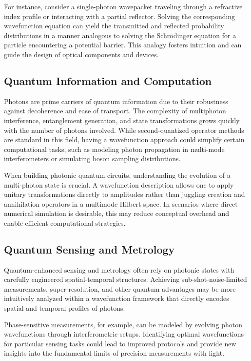 \documentclass[aps,prl,twocolumn,showpacs,showkeys,superscriptaddress,amsmath,amssymb]{revtex4-2}
\begin{document}
For instance, consider a single-photon wavepacket traveling through a refractive index profile or interacting with a partial reflector. Solving the corresponding wavefunction equation can yield the transmitted and reflected probability distributions in a manner analogous to solving the Schr\"odinger equation for a particle encountering a potential barrier. This analogy fosters intuition and can guide the design of optical components and devices.

\subsection{Quantum Information and Computation}

Photons are prime carriers of quantum information due to their robustness against decoherence and ease of transport. The complexity of multiphoton interference, entanglement generation, and state transformations grows quickly with the number of photons involved. While second-quantized operator methods are standard in this field, having a wavefunction approach could simplify certain computational tasks, such as modeling photon propagation in multi-mode interferometers or simulating boson sampling distributions.

When building photonic quantum circuits, understanding the evolution of a multi-photon state is crucial. A wavefunction description allows one to apply unitary transformations directly to amplitudes rather than juggling creation and annihilation operators in a multimode Hilbert space. In scenarios where direct numerical simulation is desirable, this may reduce conceptual overhead and enable efficient computational strategies.

\subsection{Quantum Sensing and Metrology}

Quantum-enhanced sensing and metrology often rely on photonic states with carefully engineered spatial-temporal structures. Achieving sub-shot-noise-limited measurements, super-resolution, and other quantum advantages may be more intuitively analyzed within a wavefunction framework that directly encodes spatial and temporal profiles of photons.

Phase-sensitive measurements, for example, can be modeled by evolving photon wavefunctions through interferometric setups. Identifying optimal wavefunctions for particular sensing tasks could lead to improved protocols and provide new insights into the fundamental limits of precision measurements with light.
\end{document}
